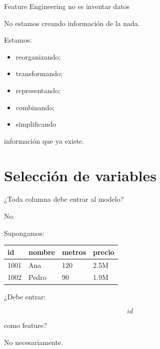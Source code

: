 \documentclass[aspectratio=169,11pt]{beamer}
\begin{document}
\begin{frame}{Feature Engineering no es inventar datos}

No estamos creando información de la nada.

Estamos:

\begin{itemize}

    \item reorganizando;

    \item transformando;

    \item representando;

    \item combinando;

    \item simplificando

\end{itemize}

información que ya existe.

\end{frame}

\section{Selección de variables}

\begin{frame}{¿Toda columna debe entrar al modelo?}

No.

Supongamos:

\begin{center}

\begin{tabular}{llll}
\toprule
id & nombre & metros & precio \\
\midrule
1001 & Ana & 120 & 2.5M \\
1002 & Pedro & 90 & 1.9M \\
\bottomrule
\end{tabular}

\end{center}

\vspace{0.5cm}

¿Debe entrar:

\[
id
\]

como feature?

No necesariamente.

\end{frame}
\end{document}
